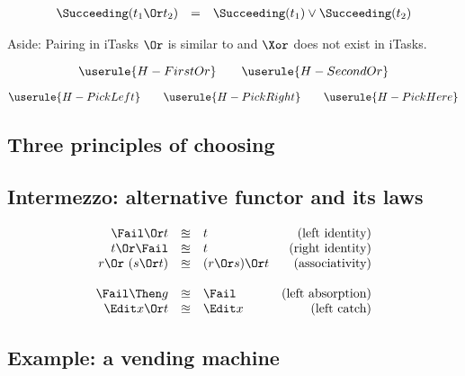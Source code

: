 \begin{equation*}
  \begin{array}{lcl}
    \Succeeding(t_1 \Or t_2) &=& \Succeeding(t_1) \lor \Succeeding(t_2)
  \end{array}
\end{equation*}

\begin{margintext}{Aside: Pairing in iTasks}
  $\Or$ is similar to \type{-||-}
  and $\Xor$ does not exist in iTasks.
\end{margintext}

\begin{equation*}
  \userule{H-FirstOr} \qquad \userule{H-SecondOr}
\end{equation*}

\begin{equation*}
  \userule{H-PickLeft} \qquad \userule{H-PickRight} \qquad \userule{H-PickHere}
\end{equation*}


\subsection{Three principles of choosing}


\subsection{Intermezzo: alternative functor and its laws}

\begin{equation*}
  \begin{array}{rclr}
    \Fail \Or t
      &\approxeq& t
      & \text{(left identity)} \\
    t \Or \Fail
      &\approxeq& t
      & \text{(right identity)} \\
    r \Or\ (s \Or t)
      &\approxeq& (r \Or s) \Or t
      & \text{(associativity)} \\
    & & & \\
    \Fail \Then g
      &\approxeq& \Fail
      & \text{(left absorption)} \\
    \Edit x \Or t
      &\approxeq& \Edit x
      & \text{(left catch)}
  \end{array}
\end{equation*}



\subsection{Example: a vending machine}

